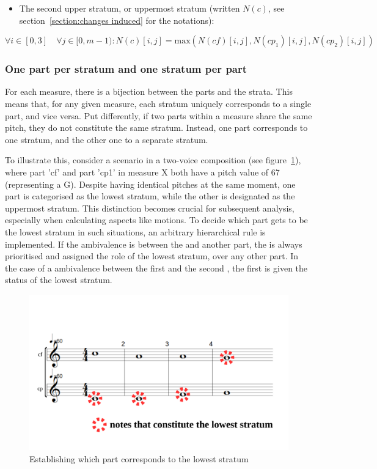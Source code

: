 \begin{itemize}
    \item The second upper stratum, or uppermost stratum (written $N(c)$, see section~\ref{section:changes induced} for the notations):
\end{itemize}   
\begin{equation}
    \forall i \in [0, 3] \quad \forall j \in [0, m-1): N(c)[i,j] = \text{max} (N(\mathit{cf})[i,j], N(cp_1)[i,j], N(cp_2)[i,j])
\end{equation}

\subsubsection{One part per stratum and one stratum per part} \label{subsubsection:one-part-per-stratum}
For each measure, there is a bijection between the parts and the strata. This means that, for any given measure, each stratum uniquely corresponds to a single part, and vice versa. Put differently, if two parts within a measure share the same pitch, they do not constitute the same stratum. Instead, one part corresponds to one stratum, and the other one to a separate stratum.

To illustrate this, consider a scenario in a two-voice composition (see figure~\ref{fig:one-voice-max-can-be-a}), where part 'cf' and part 'cp1' in measure X both have a pitch value of 67 (representing a G). Despite having identical pitches at the same moment, one part is categorised as the lowest stratum, while the other is designated as the uppermost stratum. This distinction becomes crucial for subsequent analysis, especially when calculating aspects like motions.
To decide which part gets to be the lowest stratum in such situations, an arbitrary hierarchical rule is implemented. If the ambivalence is between the \cfs and another part, the \cfs is always prioritised and assigned the role of the lowest stratum, over any other part. In the case of a ambivalence between the first \cps and the second \cp, the first \cps is given the status of the lowest stratum. 

\begin{figure}[h]
    \centering
    \includegraphics[width=.5\textwidth]{Images/one-voice-max-can-be-a.png}
    \caption{Establishing which part corresponds to the lowest stratum}
    \label{fig:one-voice-max-can-be-a}
  \end{figure}

